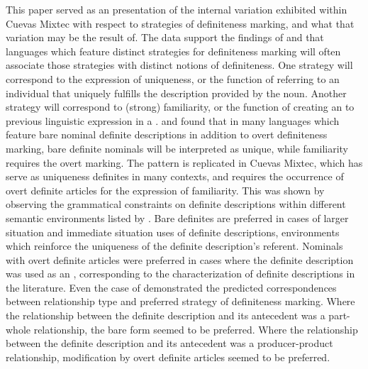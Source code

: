 \documentclass[output=paper,modfonts,nonflat]{langsci/langscibook}
\begin{document}
This paper served as an presentation of the internal variation exhibited within Cuevas Mixtec with respect to strategies of definiteness marking, and what that variation may be the result of.  The data support the findings of \citet{Schwarz2009,Schwarz2013} and \citet{Jenks2015} that languages which feature distinct strategies for definiteness marking will often associate those strategies with distinct notions of definiteness.  One strategy will correspond to the expression of uniqueness, or the function of referring to an individual that uniquely fulfills the description provided by the noun.  Another strategy will correspond to (strong) familiarity, or the function of creating an  to previous linguistic expression in a .  \citet{Schwarz2013} and \citet{Jenks2015} found that in many languages which feature bare nominal definite descriptions in addition to overt definiteness marking, bare definite nominals will be interpreted as unique, while familiarity requires the overt marking.  The pattern is replicated in Cuevas Mixtec, which has  serve as uniqueness definites in many contexts, and requires the occurrence of overt definite articles for the expression of familiarity.  This was shown by observing the grammatical constraints on definite descriptions within different semantic environments listed by \citet{Hawkins1978}.  Bare definites are preferred in cases of larger situation and immediate situation uses of definite descriptions, environments which reinforce the uniqueness of the definite description's referent.  Nominals with overt definite articles were preferred in cases where the definite description was used as an , corresponding to the  characterization of definite descriptions in the literature.  Even the case of  demonstrated the predicted correspondences between relationship type and preferred strategy of definiteness marking.  Where the relationship between the definite description and its antecedent was a part-whole relationship, the bare form seemed to be preferred.  Where the relationship between the definite description and its antecedent was a producer-product relationship, modification by overt definite articles seemed to be preferred.
\end{document}
